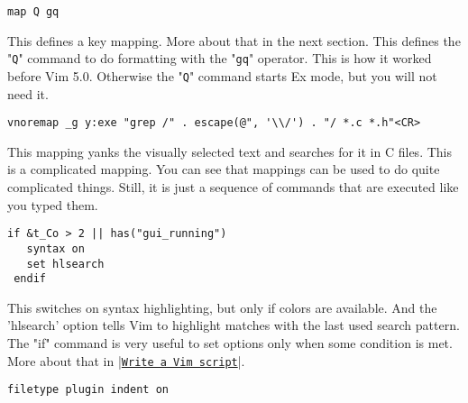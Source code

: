  \begin{Verbatim}[samepage=true]
 map Q gq
 \end{Verbatim}

This defines a key mapping.
More about that in the next section.
This defines the "\verb!Q!" command to do formatting with the "\verb!gq!" operator.
This is how it worked before Vim 5.0.
Otherwise the "\verb!Q!" command starts Ex mode, but you will not need it.

 \begin{Verbatim}[samepage=true]
 vnoremap _g y:exe "grep /" . escape(@", '\\/') . "/ *.c *.h"<CR>
 \end{Verbatim}

This mapping yanks the visually selected text and searches for it in C files.
This is a complicated mapping.
You can see that mappings can be used to do quite complicated things.
Still, it is just a sequence of commands that are executed like you typed them.

 \begin{Verbatim}[samepage=true]
 if &t_Co > 2 || has("gui_running")
   syntax on
   set hlsearch
 endif
 \end{Verbatim}

This switches on syntax highlighting, but only if colors are available.
And the 'hlsearch' option tells Vim to highlight matches with the last used search pattern.
The "if" command is very useful to set options only when some condition is met.
More about that in |\hyperref[Write a Vim script]{\texttt{Write a Vim script}}|.
\label{vimrc-filetype}
 \begin{Verbatim}[samepage=true]
 filetype plugin indent on
 \end{Verbatim}

